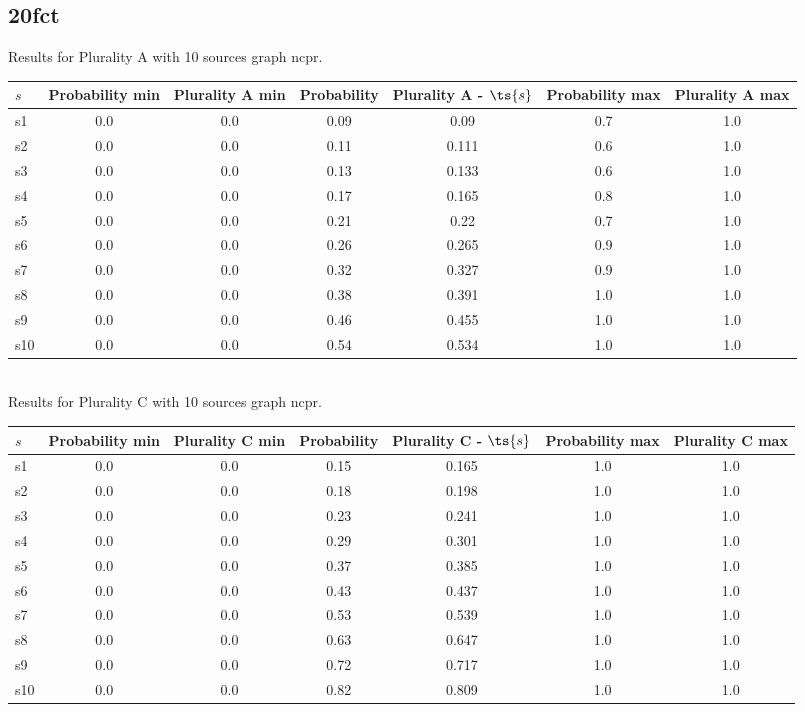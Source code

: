 \documentclass{article}
\begin{document}
\newpage

\subsection{20fct}

\noindent Results for Plurality A with 10 sources graph ncpr.

\noindent\begin{tabular}{|l|c|c|c|c|c|c|}
\hline
$s$& Probability min & Plurality A min & Probability & Plurality A - $\ts{s}$ & Probability max & Plurality A max\\
\hline
s1 &0.0 & 0.0 & 0.09 & 0.09 & 0.7 & 1.0\\
\hline
s2 &0.0 & 0.0 & 0.11 & 0.111 & 0.6 & 1.0\\
\hline
s3 &0.0 & 0.0 & 0.13 & 0.133 & 0.6 & 1.0\\
\hline
s4 &0.0 & 0.0 & 0.17 & 0.165 & 0.8 & 1.0\\
\hline
s5 &0.0 & 0.0 & 0.21 & 0.22 & 0.7 & 1.0\\
\hline
s6 &0.0 & 0.0 & 0.26 & 0.265 & 0.9 & 1.0\\
\hline
s7 &0.0 & 0.0 & 0.32 & 0.327 & 0.9 & 1.0\\
\hline
s8 &0.0 & 0.0 & 0.38 & 0.391 & 1.0 & 1.0\\
\hline
s9 &0.0 & 0.0 & 0.46 & 0.455 & 1.0 & 1.0\\
\hline
s10 &0.0 & 0.0 & 0.54 & 0.534 & 1.0 & 1.0\\
\hline
\end{tabular}\\

\noindent Results for Plurality C with 10 sources graph ncpr.

\noindent\begin{tabular}{|l|c|c|c|c|c|c|}
\hline
$s$& Probability min & Plurality C min & Probability & Plurality C - $\ts{s}$ & Probability max & Plurality C max\\
\hline
s1 &0.0 & 0.0 & 0.15 & 0.165 & 1.0 & 1.0\\
\hline
s2 &0.0 & 0.0 & 0.18 & 0.198 & 1.0 & 1.0\\
\hline
s3 &0.0 & 0.0 & 0.23 & 0.241 & 1.0 & 1.0\\
\hline
s4 &0.0 & 0.0 & 0.29 & 0.301 & 1.0 & 1.0\\
\hline
s5 &0.0 & 0.0 & 0.37 & 0.385 & 1.0 & 1.0\\
\hline
s6 &0.0 & 0.0 & 0.43 & 0.437 & 1.0 & 1.0\\
\hline
s7 &0.0 & 0.0 & 0.53 & 0.539 & 1.0 & 1.0\\
\hline
s8 &0.0 & 0.0 & 0.63 & 0.647 & 1.0 & 1.0\\
\hline
s9 &0.0 & 0.0 & 0.72 & 0.717 & 1.0 & 1.0\\
\hline
s10 &0.0 & 0.0 & 0.82 & 0.809 & 1.0 & 1.0\\
\hline
\end{tabular}\\
\end{document}
